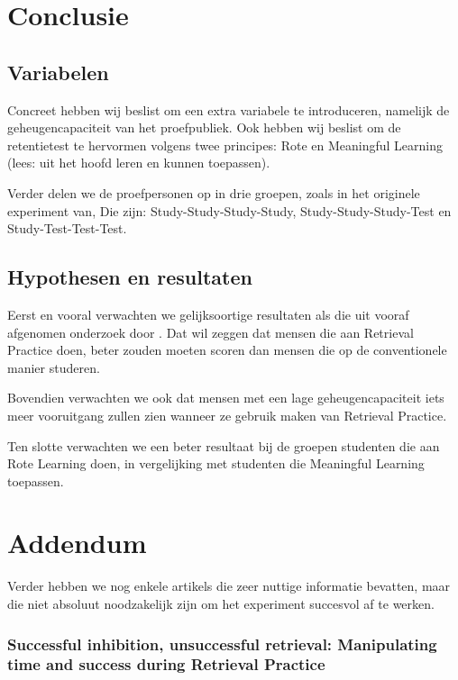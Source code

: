 \documentclass{hogent-article}
\begin{document}
\section{Conclusie}

\subsection{Variabelen}
Concreet hebben wij beslist om een extra variabele te introduceren, namelijk de geheugencapaciteit van het proefpubliek. Ook hebben wij beslist om de retentietest te hervormen volgens twee principes: Rote en Meaningful Learning (lees: uit het hoofd leren en kunnen toepassen).\\
\par
\noindent    
Verder delen we de proefpersonen op in drie groepen, zoals in het originele experiment van\textcite{Roediger_2006}, Die zijn: Study-Study-Study-Study, Study-Study-Study-Test  en Study-Test-Test-Test. 

\subsection{Hypothesen en resultaten}

\noindent
Eerst en vooral verwachten we gelijksoortige resultaten als die uit vooraf afgenomen onderzoek door \textcite{Roediger_2006}. Dat wil zeggen dat mensen die aan Retrieval Practice doen, beter zouden moeten scoren dan mensen die op de conventionele manier studeren.\\
\par
\noindent
Bovendien verwachten we ook dat mensen met een lage geheugencapaciteit iets meer vooruitgang zullen zien wanneer ze gebruik maken van Retrieval Practice.\\
\par
\noindent
Ten slotte verwachten we een beter resultaat bij de groepen studenten die aan Rote Learning doen, in vergelijking met studenten die Meaningful Learning toepassen.



\section{Addendum}

Verder hebben we nog enkele artikels die zeer nuttige informatie bevatten, maar die niet absoluut noodzakelijk zijn om het experiment succesvol af te werken.

\subsubsection{Successful inhibition, unsuccessful retrieval: Manipulating time and success during Retrieval Practice}
\end{document}
